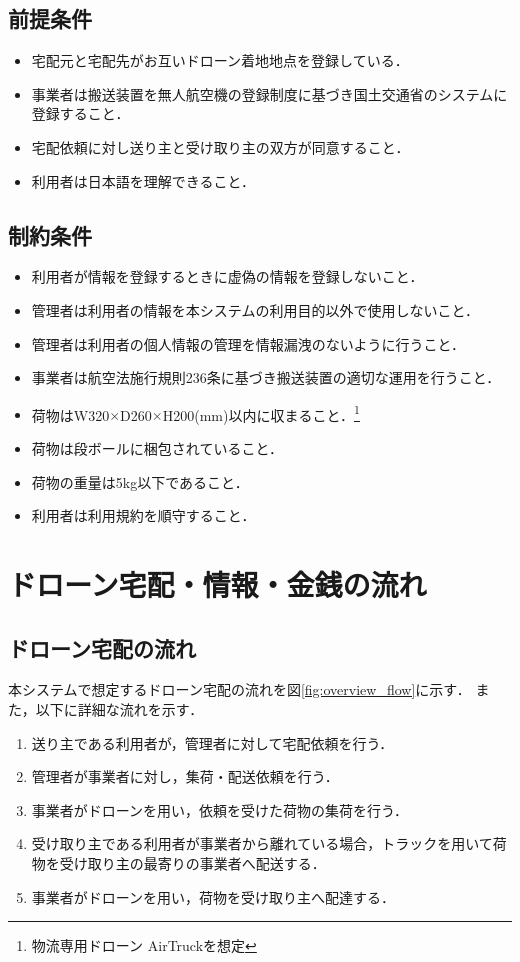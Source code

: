 \documentclass[a4paper, titlepage]{jsarticle}
\begin{document}
\subsection{前提条件}
\begin{itemize}
  \item 宅配元と宅配先がお互いドローン着地地点を登録している．
  \item 事業者は搬送装置を無人航空機の登録制度に基づき国土交通省のシステムに登録すること．
  \item 宅配依頼に対し送り主と受け取り主の双方が同意すること．
  \item 利用者は日本語を理解できること．
\end{itemize}
\subsection{制約条件}
\begin{itemize}
\item 利用者が情報を登録するときに虚偽の情報を登録しないこと．
\item 管理者は利用者の情報を本システムの利用目的以外で使用しないこと．
\item 管理者は利用者の個人情報の管理を情報漏洩のないように行うこと．
\item 事業者は航空法施行規則236条に基づき搬送装置の適切な運用を行うこと．
\item 荷物はW320$\times$D260$\times$H200(mm)以内に収まること．\footnote{\label{fot:airtruck}物流専用ドローン AirTruck\cite{aeronext_airtruck}を想定}
\item 荷物は段ボールに梱包されていること．
\item 荷物の重量は5kg以下であること．
\item 利用者は利用規約を順守すること．
\end{itemize}
\section{ドローン宅配・情報・金銭の流れ}

\subsection{ドローン宅配の流れ}
本システムで想定するドローン宅配の流れを図\ref{fig:overview_flow}に示す．
また，以下に詳細な流れを示す．

\begin{enumerate}[label=\raise0.2ex\hbox{\textcircled{\scriptsize{\arabic*}}}]
\item 送り主である利用者が，管理者に対して宅配依頼を行う．
\item 管理者が事業者に対し，集荷・配送依頼を行う．
\item 事業者がドローンを用い，依頼を受けた荷物の集荷を行う．
\item 受け取り主である利用者が事業者から離れている場合，トラックを用いて荷物を受け取り主の最寄りの事業者へ配送する．
\item 事業者がドローンを用い，荷物を受け取り主へ配達する．
\end{enumerate}
\end{document}
